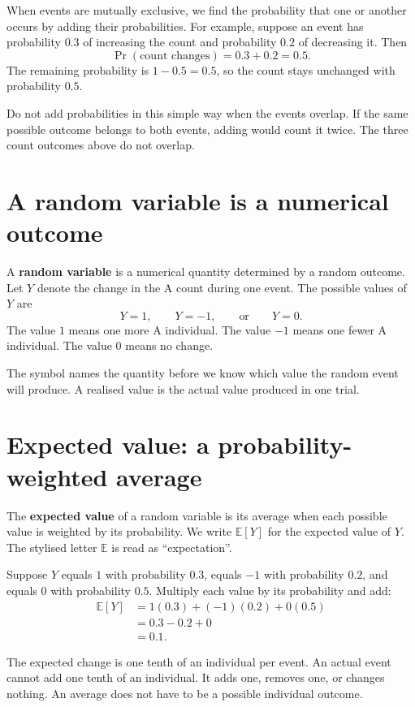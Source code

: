 When events are mutually exclusive, we find the probability that one or
another occurs by adding their probabilities. For example, suppose an event
has probability \(0.3\) of increasing the count and probability \(0.2\)
of decreasing it. Then
\[
 \Pr(\text{count changes})=0.3+0.2=0.5.
\]
The remaining probability is \(1-0.5=0.5\), so the count stays unchanged
with probability \(0.5\).

Do not add probabilities in this simple way when the events overlap. If
the same possible outcome belongs to both events, adding would count it
twice. The three count outcomes above do not overlap.

\section{A random variable is a numerical outcome}

A \textbf{random variable} is a numerical quantity determined by a random
outcome. Let \(Y\) denote the change in the A count during one event. The
possible values of \(Y\) are
\[
  Y=1,\qquad Y=-1,\qquad\text{or}\qquad Y=0.
\]
The value \(1\) means one more A individual. The value \(-1\) means one
fewer A individual. The value \(0\) means no change.

The symbol names the quantity before we know which value the random event
will produce. A realised value is the actual value produced in one trial.

\section{Expected value: a probability-weighted average}

The \textbf{expected value} of a random variable is its average when each
possible value is weighted by its probability. We write \(\mathbb{E}[Y]\)
for the expected value of \(Y\). The stylised letter \(\mathbb{E}\) is
read as ``expectation''.

Suppose \(Y\) equals \(1\) with probability \(0.3\), equals \(-1\) with
probability \(0.2\), and equals \(0\) with probability \(0.5\). Multiply
each value by its probability and add:
\begin{align*}
 \mathbb{E}[Y]
 &=1(0.3)+(-1)(0.2)+0(0.5)\\
 &=0.3-0.2+0\\
 &=0.1.
\end{align*}

The expected change is one tenth of an individual per event. An actual
event cannot add one tenth of an individual. It adds one, removes one, or
changes nothing. An average does not have to be a possible individual outcome.

